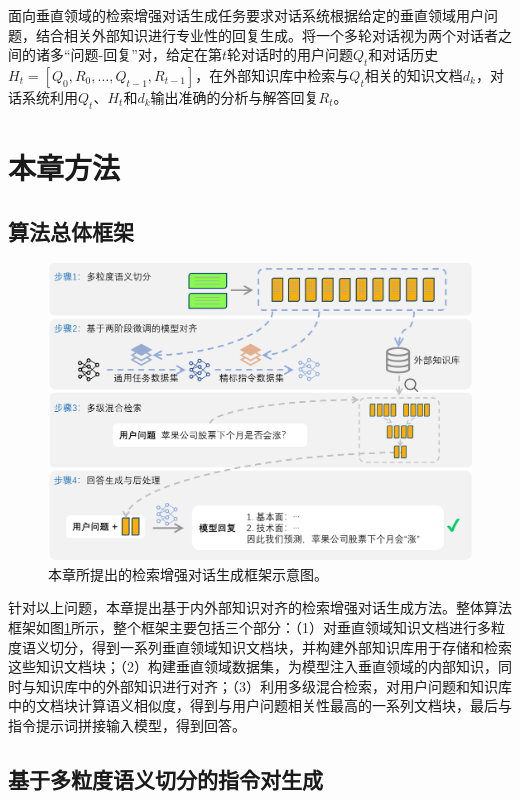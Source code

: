 面向垂直领域的检索增强对话生成任务要求对话系统根据给定的垂直领域用户问题，结合相关外部知识进行专业性的回复生成。将一个多轮对话视为两个对话者之间的诸多“问题-回复”对，给定在第$t$轮对话时的用户问题$Q_t$和对话历史$H_t=[Q_0, R_0, …, Q_{t-1}, R_{t-1}]$，在外部知识库中检索与$Q_t$相关的知识文档$d_k$，对话系统利用$Q_t$、$H_t$和$d_k$输出准确的分析与解答回复$R_t$。

\section{本章方法}
\subsection{算法总体框架}

\begin{figure}[htbp]
	\centering
	\includegraphics[scale=0.65]{Fig/rag_framework.png}
	\caption{\label{rag_framework}本章所提出的检索增强对话生成框架示意图。}
\end{figure}

针对以上问题，本章提出基于内外部知识对齐的检索增强对话生成方法。整体算法框架如图\ref{rag_framework}所示，整个框架主要包括三个部分：（1）对垂直领域知识文档进行多粒度语义切分，得到一系列垂直领域知识文档块，并构建外部知识库用于存储和检索这些知识文档块；（2）构建垂直领域数据集，为模型注入垂直领域的内部知识，同时与知识库中的外部知识进行对齐；（3）利用多级混合检索，对用户问题和知识库中的文档块计算语义相似度，得到与用户问题相关性最高的一系列文档块，最后与指令提示词拼接输入模型，得到回答。

\subsection{基于多粒度语义切分的指令对生成}

